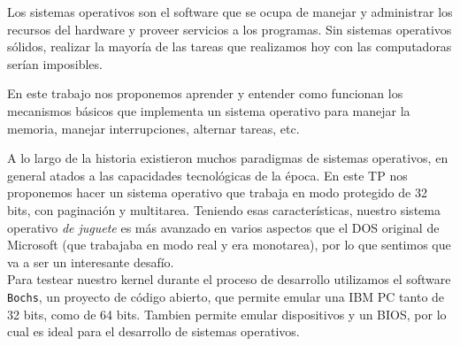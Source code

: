 
Los sistemas operativos son el software que se ocupa de manejar y administrar los recursos del hardware y proveer servicios a los programas. Sin sistemas operativos sólidos, realizar la mayoría de las tareas que realizamos hoy con las computadoras serían imposibles.

En este trabajo nos proponemos aprender y entender como funcionan los mecanismos básicos que implementa un sistema operativo para manejar la memoria, manejar interrupciones, alternar tareas, etc.

A lo largo de la historia existieron muchos paradigmas de sistemas operativos, en general atados a las capacidades tecnológicas de la época. 
En este TP nos proponemos hacer un sistema operativo que trabaja en modo protegido de 32 bits, con paginación y multitarea.
Teniendo esas características, nuestro sistema operativo \emph{de juguete} es más avanzado en varios aspectos que el DOS original de Microsoft (que trabajaba en modo real y era monotarea), por lo que sentimos que va a ser un interesante desafío.
\\

Para testear nuestro kernel durante el proceso de desarrollo utilizamos el software \texttt{Bochs}, un proyecto de código abierto, que permite emular una IBM PC tanto de 32 bits, como de 64 bits. Tambien permite emular dispositivos y un BIOS, por lo cual es ideal para el desarrollo de sistemas operativos.

